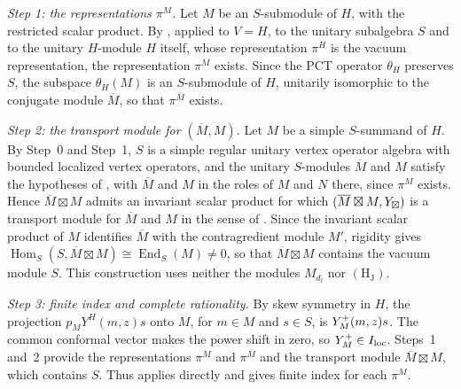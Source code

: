 \documentclass[leqno]{article}
\let\cal\relax
\newcommand{\cal}{\mathcal}
\newcommand{\ovl}{\overline}
\numberwithin{equation}{section}
\begin{document}
\emph{Step 1: the representations $\pi^M$.} Let $M$ be an $S$-submodule of $H$, with the restricted scalar product. By \cite[Theorem 5.6 p.~52]{Ten19}, applied to $V = H$, to the unitary subalgebra $S$ and to the unitary $H$-module $H$ itself, whose representation $\pi^H$ is the vacuum representation, the representation $\pi^M$ exists. Since the PCT operator $\theta_H$ preserves $S$, the subspace $\theta_H(M)$ is an $S$-submodule of $H$, unitarily isomorphic to the conjugate module $\ovl M$, so that $\pi^{\ovl M}$ exists.

\emph{Step 2: the transport module for $(\ovl M,M)$.} Let $M$ be a simple $S$-summand of $H$. By Step~0 and Step~1, $S$ is a simple regular unitary vertex operator algebra with bounded localized vertex operators, and the unitary $S$-modules $\ovl M$ and $M$ satisfy the hypotheses of \cite[Proposition 5.2]{ArhII}, with $\ovl M$ and $M$ in the roles of $M$ and $N$ there, since $\pi^M$ exists. Hence $\ovl M \boxtimes M$ admits an invariant scalar product for which $(\ovl M \boxtimes M,\cal Y_\boxtimes)$ is a transport module for $\ovl M$ and $M$ in the sense of \cite[Definition 3.3 p.~26]{Ten24}. Since the invariant scalar product of $M$ identifies $\ovl M$ with the contragredient module $M'$, rigidity gives $\operatorname{Hom}_S(S,\ovl M \boxtimes M) \cong \operatorname{End}_S(M) \neq 0$, so that $\ovl M \boxtimes M$ contains the vacuum module $S$. This construction uses neither the modules $M_{d_l}$ nor $\mathrm{(H_J)}$.

\emph{Step 3: finite index and complete rationality.} By skew symmetry in $H$, the projection $p_MY^H(m,z)s$ onto $M$, for $m\in M$ and $s\in S$, is $\cal Y_M^+(m,z)s$. The common conformal vector makes the power shift in \cite[Theorem 5.15]{Ten19} zero, so $\cal Y_M^+\in\cal I_{\mathrm{loc}}$. Steps~1 and~2 provide the representations $\pi^M$ and $\pi^{\ovl M}$ and the transport module $\ovl M \boxtimes M$, which contains $S$. Thus \cite[Theorem 4.19 p.~55]{Ten24} applies directly and gives finite index for each $\pi^M$.
\end{document}
